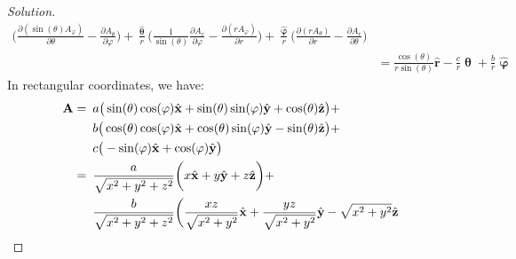 \documentclass[crop=false,class=article,oneside]{standalone}
\begin{document}
\begin{proof}[Solution]
\begin{align*}
                \bigg(
                    \frac{\partial(\sin(\theta)A_{\varphi})}
                         {\partial\theta}
                    -\frac{\partial{A_{\theta}}}
                          {\partial \varphi}
                \bigg)
                +\frac{\hat{\boldsymbol{\uptheta}}}{r}
                \bigg(
                    \frac{1}{\sin(\theta)}
                    \frac{\partial{A_{r}}}{\partial\varphi}
                    -\frac{\partial(rA_{\varphi})}{\partial{r}}
                \bigg)
                +\frac{\hat{\boldsymbol{\upvarphi}}}{r}
                \bigg(
                    \frac{\partial(rA_{\theta})}{\partial{r}}
                    -\frac{\partial{A_{r}}}{\partial\theta}
                \bigg)\\
                &=\frac{\cos(\theta)}{r\sin(\theta)}\hat{\mathbf{r}}
                -\frac{c}{r}\hat{\boldsymbol{\uptheta}}
                +\frac{b}{r}\hat{\boldsymbol{\upvarphi}}
            \end{align*}
            In rectangular coordinates, we have:
            \begin{align*}
                \mathbf{A}=\hspace{0.5em}
                &a\big(\sin(\theta)\cos(\varphi)
                 \hat{\mathbf{x}}
                +\sin(\theta)\sin(\varphi)
                 \hat{\mathbf{y}}
                +\cos(\theta)\hat{\mathbf{z}}\big)+\\
                &b\big(
                    \cos(\theta)\cos(\varphi)
                    \hat{\mathbf{x}}
                    +\cos(\theta)\sin(\varphi)
                    \hat{\mathbf{y}}
                    -\sin(\theta)\hat{\mathbf{z}}
                \big)+\\
                &c\big(
                    -\sin(\varphi)\hat{\mathbf{x}}
                    +\cos(\varphi)\hat{\mathbf{y}}
                \big)\\
                =\hspace{0.5em}
                &\frac{a}{\sqrt{x^{2}+y^{2}+z^{2}}}
                \bigg(
                    x\hat{\mathbf{x}}
                    +y\hat{\mathbf{y}}
                    +z\hat{\mathbf{z}}
                \bigg)+\\
                &\frac{b}{\sqrt{x^{2}+y^{2}+z^{2}}}
                \bigg(
                    \frac{xz}{\sqrt{x^{2}+y^{2}}}
                    \hat{\mathbf{x}}
                    +\frac{yz}{\sqrt{x^{2}+y^{2}}}
                    \hat{\mathbf{y}}
                    -\sqrt{x^{2}+y^{2}}\hat{\mathbf{z}}

\end{align*}
\end{proof}
\end{document}
